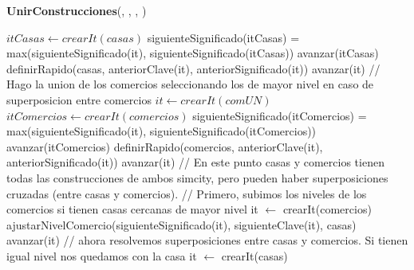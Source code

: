 \begin{Algoritmos}
\begin{algorithm}[H]{\textbf{UnirConstrucciones}(, , , )}
\begin{algorithmic}[1]
        
        \State $itCasas \gets crearIt(casas)$ 
         
             
                \State siguienteSignificado(itCasas) = max(siguienteSignificado(it), siguienteSignificado(itCasas)) 
            \EndIf
            \State avanzar(itCasas) 
        \EndWhile
         
            \State definirRapido(casas, anteriorClave(it), anteriorSignificado(it)) 
        \EndIf
        \State avanzar(it)
    \EndWhile
    \State // Hago la union de los comercios seleccionando los de mayor nivel en caso de superposicion entre comercios
    \State $it \gets crearIt(comUN)$
     
        \State $itComercios \gets crearIt(comercios)$ 
         
             
                \State siguienteSignificado(itComercios) = max(siguienteSignificado(it), siguienteSignificado(itComercios)) 
            \EndIf
            \State avanzar(itComercios) 
        \EndWhile
         
            \State definirRapido(comercios, anteriorClave(it), anteriorSignificado(it)) 
        \EndIf
        \State avanzar(it) 
    \EndWhile
    \State // En este punto casas y comercios tienen todas las construcciones de ambos simcity, pero pueden haber superposiciones cruzadas (entre casas y comercios).
    \State // Primero, subimos los niveles de los comercios si tienen casas cercanas de mayor nivel
    \State it $\gets$ crearIt(comercios) 
     
        \State ajustarNivelComercio(siguienteSignificado(it), siguienteClave(it), casas) 
        \State avanzar(it) 
    \EndWhile
    \State // ahora resolvemos superposiciones entre casas y comercios. Si tienen igual nivel nos quedamos con la casa
    \State it $\gets$ crearIt(casas) 

\end{algorithmic}
\end{algorithm}
\end{Algoritmos}
